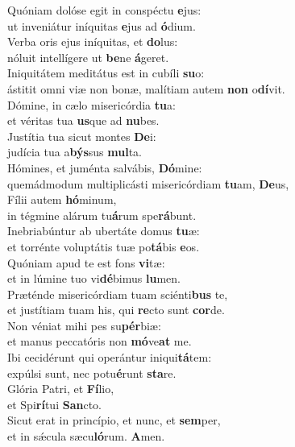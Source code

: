 \evenverse Quóniam dolóse egit in conspéctu \textbf{e}jus:~\*\\
\evenverse ut inveniátur iníquitas \textbf{e}jus ad \textbf{ó}dium.\\
\oddverse Verba oris ejus iníquitas, et \textbf{do}lus:~\*\\
\oddverse nóluit intellígere ut \textbf{be}ne \textbf{á}geret.\\
\evenverse Iniquitátem meditátus est in cubíli \textbf{su}o:~\*\\
\evenverse ástitit omni viæ non bonæ, malítiam autem \textbf{non} o\textbf{dí}vit.\\
\oddverse Dómine, in cælo misericórdia \textbf{tu}a:~\*\\
\oddverse et véritas tua \textbf{us}que ad \textbf{nu}bes.\\
\evenverse Justítia tua sicut montes \textbf{De}i:~\*\\
\evenverse judícia tua a\textbf{býs}sus \textbf{mul}ta.\\
\oddverse Hómines, et juménta salvábis, \textbf{Dó}mine:~\*\\
\oddverse quemádmodum multiplicásti misericórdiam \textbf{tu}am, \textbf{De}us,\\
\evenverse Fílii autem \textbf{hó}minum,~\*\\
\evenverse in tégmine alárum tu\textbf{á}rum spe\textbf{rá}bunt.\\
\oddverse Inebriabúntur ab ubertáte domus \textbf{tu}æ:~\*\\
\oddverse et torrénte voluptátis tuæ po\textbf{tá}bis \textbf{e}os.\\
\evenverse Quóniam apud te est fons \textbf{vi}tæ:~\*\\
\evenverse et in lúmine tuo vi\textbf{dé}bimus \textbf{lu}men.\\
\oddverse Præténde misericórdiam tuam sciénti\textbf{bus} te,~\*\\
\oddverse et justítiam tuam his, qui \textbf{re}cto sunt \textbf{cor}de.\\
\evenverse Non véniat mihi pes su\textbf{pér}biæ:~\*\\
\evenverse et manus peccatóris non \textbf{mó}ve\textbf{at} me.\\
\oddverse Ibi cecidérunt qui operántur iniqui\textbf{tá}tem:~\*\\
\oddverse expúlsi sunt, nec potu\textbf{é}runt \textbf{sta}re.\\
\evenverse Glória Patri, et \textbf{Fí}lio,~\*\\
\evenverse et Spi\textbf{rí}tui \textbf{San}cto.\\
\oddverse Sicut erat in princípio, et nunc, et \textbf{sem}per,~\*\\
\oddverse et in sǽcula sæcu\textbf{ló}rum. \textbf{A}men.\\
